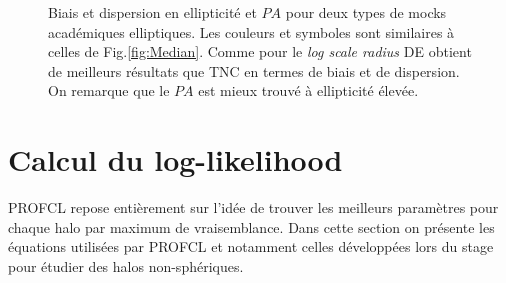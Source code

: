 \documentclass[a4paper,11pt]{article}
\numberwithin{equation}{section}
\begin{document}
\begin{figure}
\begin{minipage}{\textwidth}
	  \caption{Biais et dispersion en ellipticité et $PA$ pour deux types de mocks académiques elliptiques. Les couleurs et symboles sont similaires à celles de Fig.\ref{fig:Median}. Comme pour le \textit{log scale radius} DE obtient de meilleurs résultats que TNC en termes de biais et de dispersion. On remarque que le $PA$ est mieux trouvé à ellipticité élevée.}
	  \label{fig:Mocks}
	  \end{minipage}
  \end{figure}

	
	
	
	
	
  \newpage
  \section{Calcul du log-likelihood}
	PROFCL repose entièrement sur l'idée de trouver les meilleurs paramètres pour chaque halo par maximum de vraisemblance. Dans cette section on présente les équations utilisées par PROFCL et notamment celles développées lors du stage pour étudier des halos non-sphériques.  
  
\end{document}
